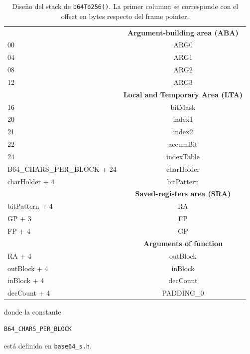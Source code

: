 \begin{table}[H]
  \centering
  \begin{tabular}{@{}l|c|@{}}
    \cmidrule(l){2-2} 
    \multicolumn{1}{c|}{\textbf{}} & \textbf{Argument-building area (ABA)} \\ \cmidrule(l){2-2} 
    00 & ARG0 \\ \cmidrule(l){2-2} 
    04 & ARG1 \\ \cmidrule(l){2-2} 
    08 & ARG2 \\ \cmidrule(l){2-2}
    12 & ARG3 \\ \cmidrule(l){2-2} 
    \multicolumn{1}{c|}{\textbf{}} & \textbf{Local and Temporary Area (LTA)} \\ \cmidrule(l){2-2} 
    16 & bitMask \\ \cmidrule(l){2-2} 
    20 & index1 \\ \cmidrule(l){2-2} 
    21 & index2 \\ \cmidrule(l){2-2} 
    22 & accumBit \\ \cmidrule(l){2-2} 
    24 & indexTable \\ \cmidrule(l){2-2} 
    B64\_CHARS\_PER\_BLOCK + 24 & charHolder \\ \cmidrule(l){2-2}
    charHolder + 4 & bitPattern \\ \cmidrule(l){2-2}
    \multicolumn{1}{c|}{\textbf{}} & \textbf{Saved-registers area (SRA)} \\ \cmidrule(l){2-2} 
    bitPattern + 4 & RA \\ \cmidrule(l){2-2} 
    GP + 3 & FP \\ \cmidrule(l){2-2} 
    FP + 4 & GP \\ \cmidrule(l){2-2} 
    \multicolumn{1}{c|}{\textbf{}} & \textbf{Arguments of function} \\ \cmidrule(l){2-2} 
    RA + 4 & outBlock \\ \cmidrule(l){2-2} 
    outBlock + 4 & inBlock \\ \cmidrule(l){2-2}
    inBlock + 4 & decCount \\ \cmidrule(l){2-2}
    decCount + 4 & PADDING\_0 \\ \cmidrule(l){2-2} 
  \end{tabular}
  \caption{Diseño del stack de \texttt{b64To256()}. La primer columna se corresponde con el offset en bytes respecto del frame pointer.}
  \label{stack_b64To256}
\end{table}

donde la constante
\begin{lstlisting}[language=C, style=StyleC]
B64_CHARS_PER_BLOCK
\end{lstlisting}
está definida en \texttt{base64\_s.h}.
	
